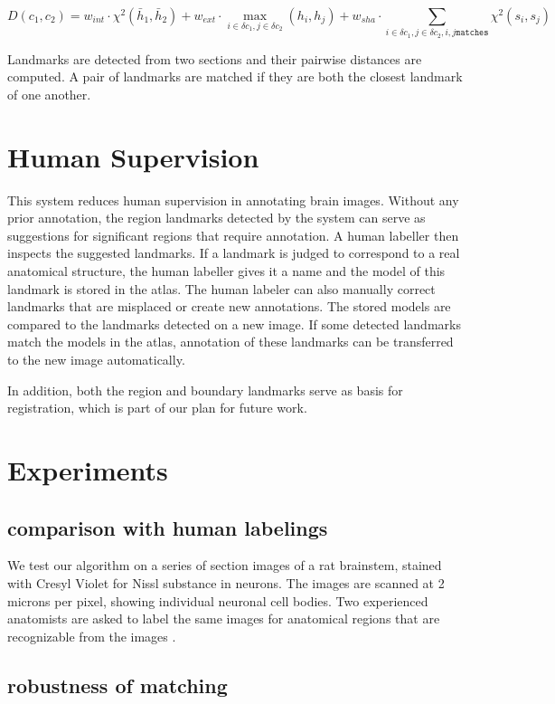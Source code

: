 \documentclass{llncs}
\begin{document}
$$D(c_1, c_2) = w_{int} \cdot \chi^2(\bar{h}_1, \bar{h}_2) + 
w_{ext} \cdot \max_{i \in \delta c_1, j\in \delta c_2}(h_i, h_j) +
w_{sha} \cdot \sum_{i \in \delta c_1, j \in \delta c_2, i, j \mathtt{matches}} \chi^2(s_i, s_j)
$$

Landmarks are detected from two sections and their pairwise distances are computed. A pair of landmarks are matched if they are both the closest landmark of one another.

\section{Human Supervision}

This system reduces human supervision in annotating brain images. Without any prior annotation, the region landmarks detected by the system can serve as suggestions for significant regions that require annotation. A human labeller then inspects the suggested landmarks. If a landmark is judged to correspond to a real anatomical structure, the human labeller gives it a name and the model of this landmark is stored in the atlas. The human labeler can also manually correct landmarks that are misplaced or create new annotations.
The stored models are compared to the landmarks detected on a new image. If some detected landmarks match the models in the atlas, annotation of these landmarks can be transferred to the new image automatically.

In addition, both the region and boundary landmarks serve as basis for registration, which is part of our plan for future work.


\section{Experiments}

\subsection{comparison with human labelings}

We test our algorithm on a series of section images of a rat brainstem, stained with Cresyl Violet for Nissl substance in neurons. The images are scanned at 2 microns per pixel, showing individual neuronal cell bodies. Two experienced anatomists are asked to label the same images for anatomical regions that are recognizable from the images .

\subsection{robustness of matching}
\end{document}
